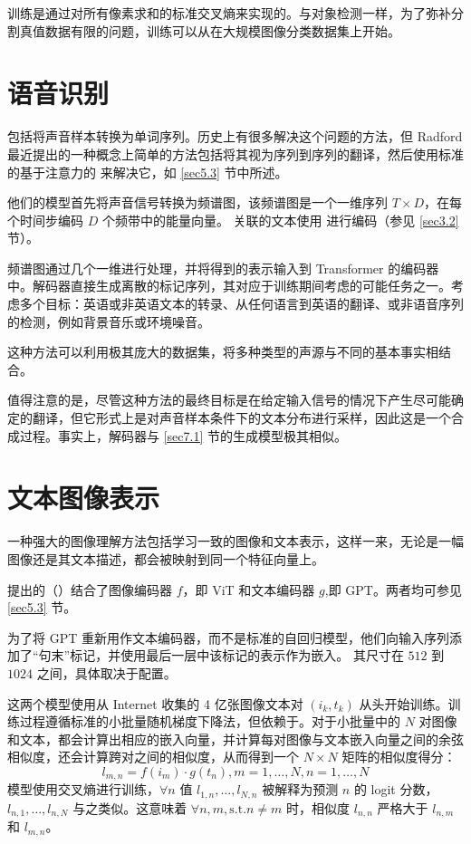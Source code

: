训练是通过对所有像素求和的标准交叉熵来实现的。与对象检测一样，为了弥补分割真值数据有限的问题，训练可以从在大规模图像分类数据集上开始。

\section{语音识别}\label{sec6.5}

包括将声音样本转换为单词序列。历史上有很多解决这个问题的方法，但 Radford \cite{arxiv-2212.04356} 最近提出的一种概念上简单的方法包括将其视为序列到序列的翻译，然后使用标准的基于注意力的  来解决它，如 \ref{sec5.3} 节中所述。

他们的模型首先将声音信号转换为频谱图，该频谱图是一个一维序列 $T \times D$，在每个时间步编码 $D$ 个频带中的能量向量。 关联的文本使用 进行编码（参见 \ref{sec3.2} 节）。

频谱图通过几个一维进行处理，并将得到的表示输入到 Transformer 的编码器中。解码器直接生成离散的标记序列，其对应于训练期间考虑的可能任务之一。考虑多个目标：英语或非英语文本的转录、从任何语言到英语的翻译、或非语音序列的检测，例如背景音乐或环境噪音。

这种方法可以利用极其庞大的数据集，将多种类型的声源与不同的基本事实相结合。

值得注意的是，尽管这种方法的最终目标是在给定输入信号的情况下产生尽可能确定的翻译，但它形式上是对声音样本条件下的文本分布进行采样，因此这是一个合成过程。事实上，解码器与 \ref{sec7.1} 节的生成模型极其相似。

\section{文本图像表示}\label{sec6.6}

一种强大的图像理解方法包括学习一致的图像和文本表示，这样一来，无论是一幅图像还是其文本描述，都会被映射到同一个特征向量上。

\cite{arxiv-2103.00020} 提出的（）结合了图像编码器 $f$，即 ViT 和文本编码器 $g$,即 GPT。两者均可参见 \ref{sec5.3} 节。

为了将 GPT 重新用作文本编码器，而不是标准的自回归模型，他们向输入序列添加了``句末''标记，并使用最后一层中该标记的表示作为嵌入。 其尺寸在 $512$ 到 $1024$ 之间，具体取决于配置。

这两个模型使用从 Internet 收集的 4 亿张图像文本对 $(i_k,t_k)$ 从头开始训练。训练过程遵循标准的小批量随机梯度下降法，但依赖于。对于小批量中的 $N$ 对图像和文本，都会计算出相应的嵌入向量，并计算每对图像与文本嵌入向量之间的余弦相似度，还会计算跨对之间的相似度，从而得到一个 $N \times N$ 矩阵的相似度得分：
\[l_{m,n} = f(i_m) \cdot g(t_n), m = 1,\dots,N, n = 1,\dots,N\]
模型使用交叉熵进行训练，$\forall n$ 值 $l_{1,n},\dots,l_{N,n}$ 被解释为预测 $n$ 的 logit 分数，$l_{n,1},\dots,l_{n,N}$ 与之类似。这意味着 $\forall n,m, \text{s.t.} n \ne m$ 时，相似度 $l_{n,n}$ 严格大于 $l_{n,m}$ 和 $l_{m,n}$。

